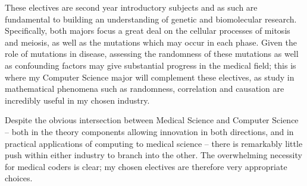 These electives are second year introductory subjects and as such are fundamental to building an understanding of genetic and biomolecular research. Specifically, both majors focus a great deal on the cellular processes of mitosis and meiosis, as well as the mutations which may occur in each phase. Given the role of mutations in disease, assessing the randomness of these mutations as well as confounding factors may give substantial progress in the medical field; this is where my Computer Science major will complement these electives, as study in mathematical phenomena such as randomness, correlation and causation are incredibly useful in my chosen industry.


Despite the obvious intersection between Medical Science and Computer Science – both in the theory components allowing innovation in both directions, and in practical applications of computing to medical science – there is remarkably little push within either industry to branch into the other. The overwhelming necessity for medical coders is clear; my chosen electives are therefore very appropriate choices.
